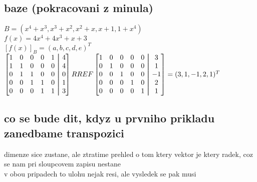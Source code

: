 \documentclass[a4paper]{article}
\newcommand\aug{\fboxsep=-\fboxrule\!\!\!\fbox{\strut}\!\!\!}
\begin{document}
\subsection{baze (pokracovani z minula)}
$B=(x^4+x^3, x^3+x^2, x^2+x, x+1, 1+x^4)$
\\
$f(x)=4x^4+4x^3+x+3$
\\
$[f(x)]_B = (a,b,c,d,e)^T$
\\
$
\begin{bmatrix}
	1 & 0 & 0 & 0 & 1 &\aug& 4 \\
	1 & 1 & 0 & 0 & 0 &\aug& 4 \\
	0 & 1 & 1 & 0 & 0 &\aug& 0 \\
	0 & 0 & 1 & 1 & 0 &\aug& 1 \\
	0 & 0 & 0 & 1 & 1 &\aug& 3
\end{bmatrix}
RREF
\begin{bmatrix}
	1 & 0 & 0 & 0 & 0 &\aug& 3 \\
	0 & 1 & 0 & 0 & 0 &\aug& 1 \\
	0 & 0 & 1 & 0 & 0 &\aug& -1 \\
	0 & 0 & 0 & 1 & 0 &\aug& 2 \\
	0 & 0 & 0 & 0 & 1 &\aug& 1
\end{bmatrix}
=(3,1,-1,2,1)^T
$


\subsection{co se bude dit, kdyz u prvniho prikladu zanedbame transpozici}
dimenze sice zustane, ale ztratime prehled o tom ktery vektor je ktery radek,
coz se nam pri sloupcovem zapisu nestane
\\
v obou pripadech to ulohu nejak resi, ale vysledek se pak musi 
\\
\end{document}
